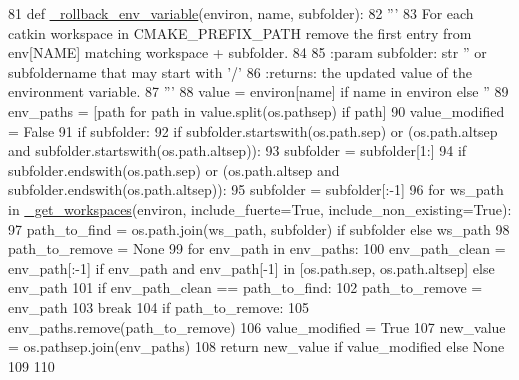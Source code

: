 \begin{DoxyCode}
81 \textcolor{keyword}{def }\hyperlink{namespace__setup__util_a45389205be3d6e2efe8b6f8409a8059b}{\_rollback\_env\_variable}(environ, name, subfolder):
82     \textcolor{stringliteral}{'''}
83 \textcolor{stringliteral}{    For each catkin workspace in CMAKE\_PREFIX\_PATH remove the first entry from env[NAME] matching workspace
       + subfolder.}
84 \textcolor{stringliteral}{}
85 \textcolor{stringliteral}{    :param subfolder: str '' or subfoldername that may start with '/'}
86 \textcolor{stringliteral}{    :returns: the updated value of the environment variable.}
87 \textcolor{stringliteral}{    '''}
88     value = environ[name] \textcolor{keywordflow}{if} name \textcolor{keywordflow}{in} environ \textcolor{keywordflow}{else} \textcolor{stringliteral}{''}
89     env\_paths = [path \textcolor{keywordflow}{for} path \textcolor{keywordflow}{in} value.split(os.pathsep) \textcolor{keywordflow}{if} path]
90     value\_modified = \textcolor{keyword}{False}
91     \textcolor{keywordflow}{if} subfolder:
92         \textcolor{keywordflow}{if} subfolder.startswith(os.path.sep) \textcolor{keywordflow}{or} (os.path.altsep \textcolor{keywordflow}{and} subfolder.startswith(os.path.altsep)):
93             subfolder = subfolder[1:]
94         \textcolor{keywordflow}{if} subfolder.endswith(os.path.sep) \textcolor{keywordflow}{or} (os.path.altsep \textcolor{keywordflow}{and} subfolder.endswith(os.path.altsep)):
95             subfolder = subfolder[:-1]
96     \textcolor{keywordflow}{for} ws\_path \textcolor{keywordflow}{in} \hyperlink{namespace__setup__util_ab2be07aa31918f1e1e34d6b7c4d66fcb}{\_get\_workspaces}(environ, include\_fuerte=\textcolor{keyword}{True}, include\_non\_existing=\textcolor{keyword}{True}):
97         path\_to\_find = os.path.join(ws\_path, subfolder) \textcolor{keywordflow}{if} subfolder \textcolor{keywordflow}{else} ws\_path
98         path\_to\_remove = \textcolor{keywordtype}{None}
99         \textcolor{keywordflow}{for} env\_path \textcolor{keywordflow}{in} env\_paths:
100             env\_path\_clean = env\_path[:-1] \textcolor{keywordflow}{if} env\_path \textcolor{keywordflow}{and} env\_path[-1] \textcolor{keywordflow}{in} [os.path.sep, os.path.altsep] \textcolor{keywordflow}{
      else} env\_path
101             \textcolor{keywordflow}{if} env\_path\_clean == path\_to\_find:
102                 path\_to\_remove = env\_path
103                 \textcolor{keywordflow}{break}
104         \textcolor{keywordflow}{if} path\_to\_remove:
105             env\_paths.remove(path\_to\_remove)
106             value\_modified = \textcolor{keyword}{True}
107     new\_value = os.pathsep.join(env\_paths)
108     \textcolor{keywordflow}{return} new\_value \textcolor{keywordflow}{if} value\_modified \textcolor{keywordflow}{else} \textcolor{keywordtype}{None}
109 
110 
\end{DoxyCode}



